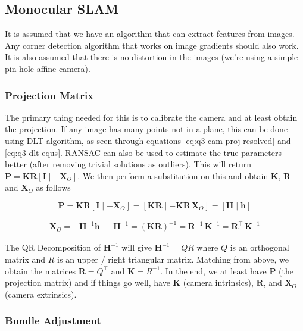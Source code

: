 
\subsection{Monocular SLAM}

It is assumed that we have an algorithm that can extract features from images. Any corner detection algorithm that works on image gradients should also work. It is also assumed that there is no distortion in the images (we're using a simple pin-hole affine camera).

\subsubsection*{Projection Matrix}

The primary thing needed for this is to calibrate the camera and at least obtain the projection. If any image has many points not in a plane, this can be done using DLT algorithm, as seen through equations \ref{eq:q3-cam-proj-resolved} and \ref{eq:q3-dlt-equs}. RANSAC can also be used to estimate the true parameters better (after removing trivial solutions as outliers). This will return $\mathbf{P} = \mathbf{K R} [\mathbf{I} \mid -\mathbf{X}_O]$. We then perform a substitution on this and obtain $\mathbf{K}$, $\mathbf{R}$ and $\mathbf{X}_O$ as follows

\begin{equation*}
    \mathbf{P} = \mathbf{K R} \left [ \mathbf{I} \mid -\mathbf{X}_O \right ] = \left [ \mathbf{K R} \mid -\mathbf{K R} \, \mathbf{X}_O \right ] = \left [ \mathbf{H \mid h} \right ]
\end{equation*}

\begin{align}
    \mathbf{X}_O = -\mathbf{H}^{-1} \mathbf{h}
    &&
    \mathbf{H}^{-1} = \left ( \mathbf{KR} \right )^{-1} = \mathbf{R}^{-1} \, \mathbf{K}^{-1} = \mathbf{R}^\top \, \mathbf{K}^{-1}
\end{align}

The QR Decomposition of $\mathbf{H}^{-1}$ will give $\mathbf{H}^{-1} = QR$ where $Q$ is an orthogonal matrix and $R$ is an upper / right triangular matrix. Matching from above, we obtain the matrices $\mathbf{R} = Q^\top$ and $\mathbf{K} = R^{-1}$. In the end, we at least have $\mathbf{P}$ (the projection matrix) and if things go well, have $\mathbf{K}$ (camera intrinsics), $\mathbf{R}$, and $\mathbf{X}_O$ (camera extrinsics).

\subsubsection*{Bundle Adjustment}

